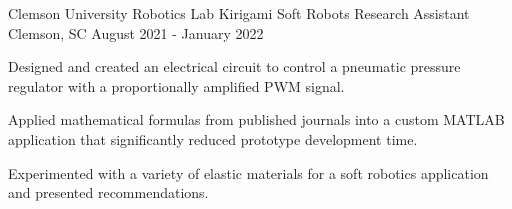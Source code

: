 

\begin{cventries}

  \cventry
    {Clemson University Robotics Lab} %
    {Kirigami Soft Robots Research Assistant} %
    {Clemson, SC} %
	{August 2021 - January 2022} %
  {
  \begin{cvitems}%
    \item {Designed and created an electrical circuit to control a pneumatic pressure regulator with a proportionally amplified PWM signal.}
    \item {Applied mathematical formulas from published journals into a custom MATLAB application that significantly reduced prototype development time.} 
    \item {Experimented with a variety of elastic materials for a soft robotics application and presented recommendations.}
  \end{cvitems}
  }
\end{cventries}

